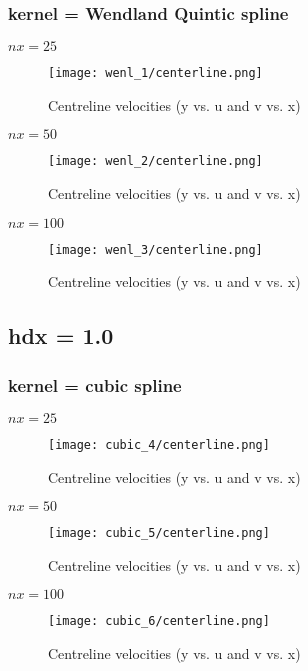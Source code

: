 \documentclass{article}
\begin{document}
\newpage
\subsubsection{kernel = Wendland Quintic spline}
$nx = 25 $
\\
\begin{figure}[H]   \label{figure}
\texttt{[image: wenl\_1/centerline.png]}
\caption{Centreline velocities (y vs. u and v vs. x)}
\label{figure:}
\end{figure}

\newpage
$nx = 50 $
\\
\begin{figure}[H]   \label{figure}
\texttt{[image: wenl\_2/centerline.png]}
\caption{Centreline velocities (y vs. u and v vs. x)}
\label{figure:}
\end{figure}

\newpage
$nx = 100 $
\\
\begin{figure}[H]   \label{figure}
\texttt{[image: wenl\_3/centerline.png]}
\caption{Centreline velocities (y vs. u and v vs. x)}
\label{figure:}
\end{figure}
\newpage

\subsection{hdx = 1.0}
\subsubsection{kernel = cubic spline}
$nx = 25 $
\\
\begin{figure}[H]   \label{figure}
\texttt{[image: cubic\_4/centerline.png]}
\caption{Centreline velocities (y vs. u and v vs. x)}
\label{figure:}
\end{figure}

\newpage
$nx = 50 $
\\
\begin{figure}[H]   \label{figure}
\texttt{[image: cubic\_5/centerline.png]}
\caption{Centreline velocities (y vs. u and v vs. x)}
\label{figure:}
\end{figure}

\newpage
$nx = 100 $
\\
\begin{figure}[H]   \label{figure}
\texttt{[image: cubic\_6/centerline.png]}
\caption{Centreline velocities (y vs. u and v vs. x)}
\label{figure:}
\end{figure}
\end{document}
